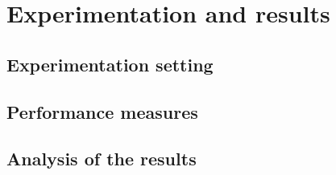\section{Experimentation and results}\label{experimentation}

\subsection{Experimentation setting}

\subsection{Performance measures}

\subsection{Analysis of the results}

